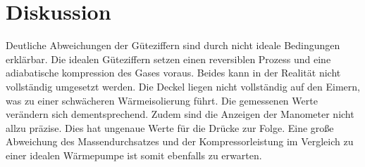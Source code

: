 \section{Diskussion}
\label{sec:Diskussion}

Deutliche Abweichungen der Güteziffern sind durch nicht ideale Bedingungen erklärbar.
Die idealen Güteziffern setzen einen reversiblen Prozess und eine  adiabatische
kompression des Gases voraus. Beides kann in der Realität nicht vollständig
umgesetzt werden.
Die Deckel liegen nicht vollständig auf den Eimern, was zu einer schwächeren
Wärmeisolierung führt. Die gemessenen Werte verändern sich
dementsprechend. Zudem sind die Anzeigen der Manometer nicht allzu präzise. Dies hat
ungenaue Werte für die Drücke zur Folge. Eine große Abweichung des Massendurchsatzes
und der Kompressorleistung im Vergleich zu einer idealen Wärmepumpe ist somit ebenfalls zu
erwarten.
